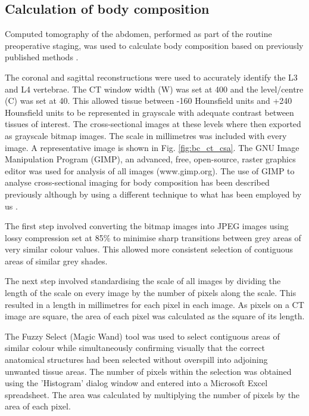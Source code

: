 \subsection{Calculation of body composition}
\label{sec:bodycomp_calculation}
Computed tomography of the abdomen, performed as part of the routine preoperative staging, was used to calculate body composition based on previously published methods \parencite{bredella_comparison_2010,shen_total_2004}.

The coronal and sagittal reconstructions were used to accurately identify the L3 and L4 vertebrae. 
The CT window width (W) was set at 400 and the level/centre (C) was set at 40. 
This allowed tissue between -160 Hounsfield units and +240 Hounsfield units to be represented in grayscale with adequate contrast between tissues of interest. 
The cross-sectional images at these levels where then exported as grayscale bitmap images. 
The scale in millimetres was included with every image. 
A representative image is shown in Fig. \ref{fig:bc_ct_csa}.
The GNU Image Manipulation Program (GIMP), an advanced, free, open-source, raster graphics editor was used for analysis of all images (www.gimp.org). 
The use of GIMP to analyse cross-sectional imaging for body composition has been described previously although by using a different technique to what has been employed by us \parencite{anblagan_measurement_2013}.

The first step involved converting the bitmap images into JPEG images using lossy compression set at 85\% to minimise sharp transitions between grey areas of very similar colour values. 
This allowed more consistent selection of contiguous areas of similar grey shades. 

The next step involved standardising the scale of all images by dividing the length of the scale on every image by the number of pixels along the scale. 
This resulted in a length in millimetres for each pixel in each image. 
As pixels on a CT image are square, the area of each pixel was calculated as the square of its length. 

The Fuzzy Select (Magic Wand) tool was used to select contiguous areas of similar colour while simultaneously confirming visually that the correct anatomical structures had been selected without overspill into adjoining unwanted tissue areas. 
The number of pixels within the selection was obtained using the 'Histogram' dialog window and entered into a Microsoft Excel spreadsheet.
The area was calculated by multiplying the number of pixels by the area of each pixel.

